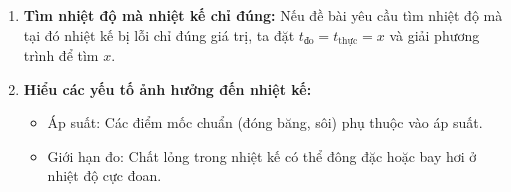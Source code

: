 \begin{phuongphap}
\begin{enumerate}
\begin{itemize}
		\end{itemize}
		\item \textbf{Tìm nhiệt độ mà nhiệt kế chỉ đúng:}
		Nếu đề bài yêu cầu tìm nhiệt độ mà tại đó nhiệt kế bị lỗi chỉ đúng giá trị, ta đặt $t_{\mathrm{đo}} = t_{\mathrm{thực}} = x$ và giải phương trình để tìm $x$.
		\item \textbf{Hiểu các yếu tố ảnh hưởng đến nhiệt kế:}
		\begin{itemize}
			\item Áp suất: Các điểm mốc chuẩn (đóng băng, sôi) phụ thuộc vào áp suất.
			\item Giới hạn đo: Chất lỏng trong nhiệt kế có thể đông đặc hoặc bay hơi ở nhiệt độ cực đoan.
		\end{itemize}
	\end{enumerate}
\end{phuongphap}
